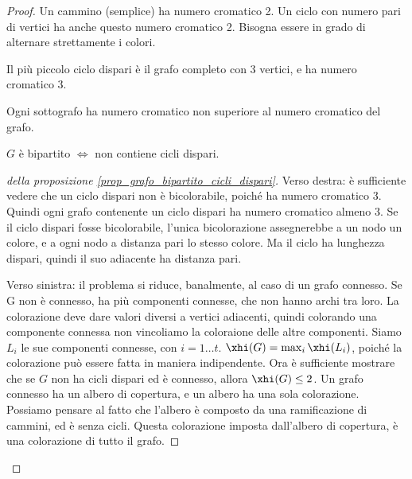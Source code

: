 \begin{proof}
	Un cammino (semplice) ha numero cromatico 2.
	Un ciclo con numero pari di vertici ha anche questo numero cromatico 2.
	Bisogna essere in grado di alternare strettamente i colori.

	Il pi\`u piccolo ciclo dispari \`e il grafo completo con 3 vertici, e ha numero cromatico 3.

	Ogni sottografo ha numero cromatico non superiore al numero cromatico del grafo.

	\begin{prop}
		\label{prop_grafo_bipartito_cicli_dispari}
		$G$ \`e bipartito $\iff$ non contiene cicli dispari.
	\end{prop}

	\begin{proof}[della proposizione \ref{prop_grafo_bipartito_cicli_dispari}]
		Verso destra: \`e sufficiente vedere che un ciclo dispari non \`e bicolorabile, poich\'e ha numero cromatico 3.
		Quindi ogni grafo contenente un ciclo dispari ha numero cromatico almeno 3.
		Se il ciclo dispari fosse bicolorabile, l'unica bicolorazione assegnerebbe a un nodo un colore, e a ogni nodo a distanza pari lo stesso colore.
		Ma il ciclo ha lunghezza dispari, quindi il suo adiacente ha distanza pari.

		Verso sinistra: il problema si riduce, banalmente, al caso di un grafo connesso.
		Se G non \`e connesso, ha pi\`u componenti connesse, che non hanno archi tra loro.
		La colorazione deve dare valori diversi a vertici adiacenti, quindi colorando una componente connessa non vincoliamo la coloraione delle altre componenti.
		Siamo $L_i$ le sue componenti connesse, con $i = 1 \dots t$.
		$\xhi(G) = \max_{i} \xhi(L_i)$, poich\'e la colorazione pu\`o essere fatta in maniera indipendente.
		Ora \`e sufficiente mostrare che se $G$ non ha cicli dispari ed \`e connesso, allora $\xhi(G) \le 2$.
		Un grafo connesso ha un albero di copertura, e un albero ha una sola colorazione.
		Possiamo pensare al fatto che l'albero \`e composto da una ramificazione di cammini, ed \`e senza cicli.
		Questa colorazione imposta dall'albero di copertura, \`e una colorazione di tutto il grafo.


\end{proof}
\end{proof}
